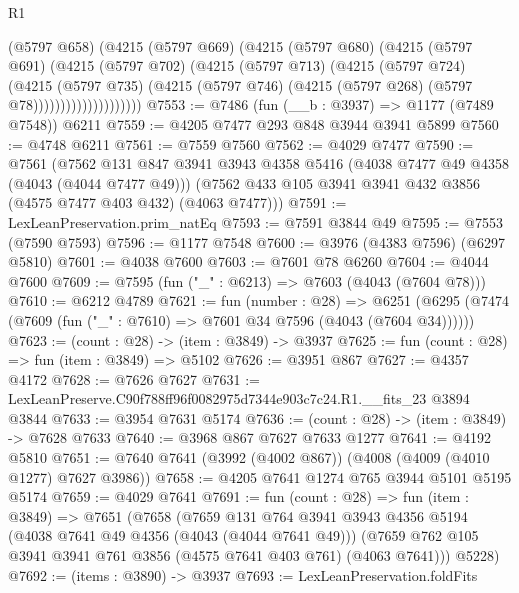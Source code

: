\begin{lexlean}{R1}
\begin{coremodule}
                        (@5797 @658)
                        (@4215
                          (@5797 @669)
                          (@4215
                            (@5797 @680)
                            (@4215
                              (@5797 @691)
                              (@4215
                                (@5797 @702)
                                (@4215
                                  (@5797 @713)
                                  (@4215
                                    (@5797 @724)
                                    (@4215
                                      (@5797 @735)
                                      (@4215
                                        (@5797 @746)
                                        (@4215 (@5797 @268) (@5797 @78))))))))))))))))))))
@7553 := @7486 (fun (__b : @3937) => @1177 (@7489 @7548)) @6211
@7559 := @4205 @7477 @293 @848 @3944 @3941 @5899
@7560 := @4748 @6211
@7561 := @7559 @7560
@7562 := @4029 @7477
@7590 := @7561
    (@7562
      @131
      @847
      @3941
      @3943
      @4358
      @5416
      (@4038 @7477 @49 @4358 (@4043 (@4044 @7477 @49)))
      (@7562 @433 @105 @3941 @3941 @432 @3856 (@4575 @7477 @403 @432) (@4063 @7477)))
@7591 := LexLeanPreservation.prim_natEq
@7593 := @7591 @3844 @49
@7595 := @7553 (@7590 @7593)
@7596 := @1177 @7548
@7600 := @3976 (@4383 @7596) (@6297 @5810)
@7601 := @4038 @7600
@7603 := @7601 @78 @6260
@7604 := @4044 @7600
@7609 := @7595 (fun ("_" : @6213) => @7603 (@4043 (@7604 @78)))
@7610 := @6212 @4789
@7621 := fun (number : @28) =>
  @6251 (@6295 (@7474 (@7609 (fun ("_" : @7610) => @7601 @34 @7596 (@4043 (@7604 @34))))))
@7623 := (count : @28) -> (item : @3849) -> @3937
@7625 := fun (count : @28) => fun (item : @3849) => @5102
@7626 := @3951 @867
@7627 := @4357 @4172
@7628 := @7626 @7627
@7631 := LexLeanPreserve.C90f788ff96f0082975d7344e903c7c24.R1.__fits_23 @3894 @3844
@7633 := @3954 @7631 @5174
@7636 := (count : @28) -> (item : @3849) -> @7628 @7633
@7640 := @3968 @867 @7627 @7633 @1277
@7641 := @4192 @5810
@7651 := @7640 @7641 (@3992 (@4002 @867)) (@4008 (@4009 (@4010 @1277) @7627 @3986))
@7658 := @4205 @7641 @1274 @765 @3944 @5101 @5195 @5174
@7659 := @4029 @7641
@7691 := fun (count : @28) =>
  fun (item : @3849) =>
  @7651
    (@7658
      (@7659
        @131
        @764
        @3941
        @3943
        @4356
        @5194
        (@4038 @7641 @49 @4356 (@4043 (@4044 @7641 @49)))
        (@7659 @762 @105 @3941 @3941 @761 @3856 (@4575 @7641 @403 @761) (@4063 @7641)))
      @5228)
@7692 := (items : @3890) -> @3937
@7693 := LexLeanPreservation.foldFits

\end{coremodule}
\end{lexlean}
